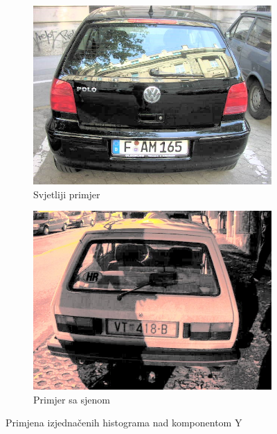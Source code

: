 \documentclass[times, utf8, diplomski]{fer}
\begin{document}
\begin{figure}[H]
     \begin{subfigure}[b]{0.4\textwidth}
         \centering
         \includegraphics[width=\textwidth]{figures/ce_examples/3/eq.jpg}
         \caption{Svjetliji primjer}
     \end{subfigure}
     \hspace{1cm}
     \begin{subfigure}[b]{0.4\textwidth}
         \centering
         \includegraphics[width=\textwidth]{figures/ce_examples/4/eq.jpg}
         \caption{Primjer sa sjenom}
     \end{subfigure}
        \caption{Primjena izjednačenih histograma nad komponentom Y}
        \label{fig:ce_eq}
\end{figure}
\end{document}
